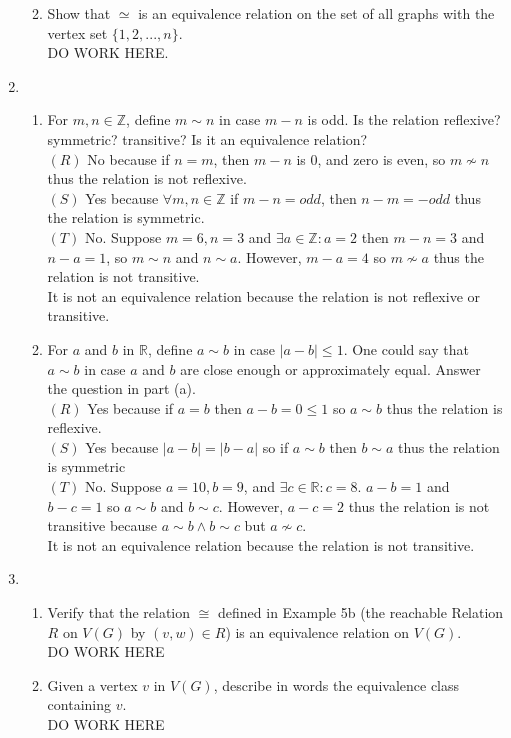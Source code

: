 \documentclass[11pt]{article}
\newcommand{\R}{\mathbb{R}}
\newcommand{\Z}{\mathbb{Z}}
\begin{document}
\begin{enumerate}
\begin{enumerate}
	\item Show that $\simeq$ is an equivalence relation on the set of all graphs with the vertex set $\{1,2,...,n\}$.\\
	DO WORK HERE.
	\end{enumerate}
\setcounter{enumi}{7}
\item
	\begin{enumerate}
	\item For $m,n\in\Z$, define $m\sim n$ in case $m-n$ is odd. Is the relation reflexive? symmetric? transitive? Is it an 
	equivalence relation?\\
	$(R)$ No because if $n=m$, then $m-n$ is 0, and zero is even, so $m\not\sim n$ thus the relation is not 
	reflexive.\\
	$(S)$ Yes because $\forall m,n\in\Z$ if $m-n=odd$, then $n-m=-odd$ thus the relation is symmetric.\\
	$(T)$ No. Suppose $m=6,n=3$ and $\exists a\in\Z:a=2$ then $m-n=3$ and $n-a=1$, so $m\sim n$ and $n\sim a$. However, 
	$m-a=4$ so $m\not\sim a$ thus the relation is not transitive.\\
	It is not an equivalence relation because the relation is not reflexive or transitive.
	\item For $a$ and $b$ in $\R$, define $a\sim b$ in case $|a-b|\leq 1$. One could say that $a\sim b$ in case $a$ and $b$ are 
	close enough or approximately equal. Answer the question in part (a).\\
	$(R)$ Yes because if $a=b$ then $a-b=0\leq1$ so $a\sim b$ thus the relation is reflexive.\\
	$(S)$ Yes because $|a-b|=|b-a|$ so if $a\sim b$ then $b\sim a$ thus the relation is symmetric\\
	$(T)$ No. Suppose $a=10,b=9$, and $\exists c\in\R:c=8$. $a-b=1$ and $b-c=1$ so $a\sim b$ and $b\sim c$. However, $a-c=2$ thus 	the relation is not transitive because $a\sim b\wedge b\sim c$ but $a\not\sim c$.\\
	It is not an equivalence relation because the relation is not transitive.
	\end{enumerate}
\setcounter{enumi}{16}
\item 
	\begin{enumerate}
	\item Verify that the relation $\cong$ defined in Example 5b (the reachable Relation $R$ on $V(G)$ by $(v,w)\in R$) is an 
	equivalence relation on $V(G)$.\\
	DO WORK HERE
	\item Given a vertex $v$ in $V(G)$, describe in words the equivalence class containing $v$.\\
	DO WORK HERE
	\end{enumerate}
\end{enumerate}
\end{document}
